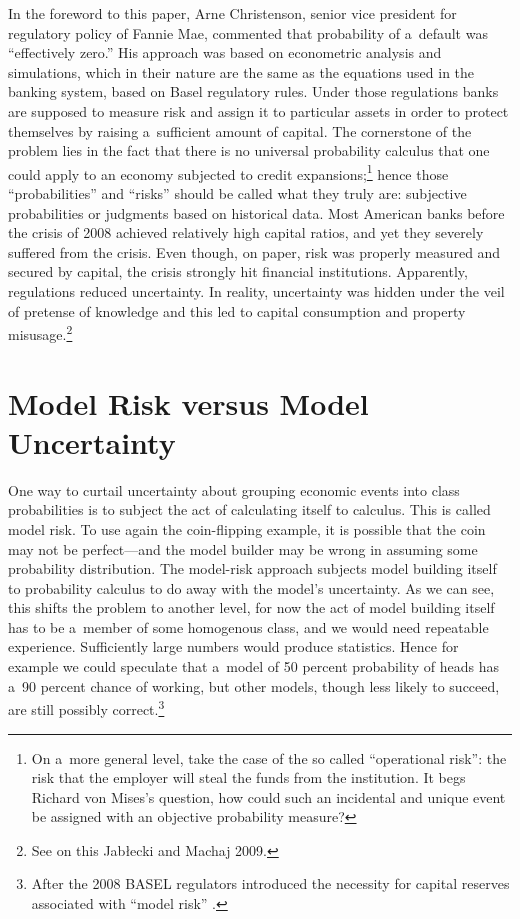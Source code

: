 In the foreword to this paper, Arne Christenson, senior vice president for regulatory policy of Fannie Mae, commented that probability of a~default was ``effectively zero.'' His approach was based on econometric analysis and simulations, which in their nature are the same as the equations used in the banking system, based on Basel regulatory rules. Under those regulations banks are supposed to measure risk and assign it to particular assets in order to protect themselves by raising a~sufficient amount of capital. The cornerstone of the problem lies in the fact that there is no universal probability calculus that one could apply to an economy subjected to credit expansions;\footnote{On a~more general level, take the case of the so called ``operational risk'': the risk that the employer will steal the funds from the institution. It begs Richard von Mises's question, how could such an incidental and unique event be assigned with an objective probability measure?} hence those ``probabilities'' and ``risks'' should be called what they truly are: subjective probabilities or judgments based on historical data. Most American banks before the crisis of 2008 achieved relatively high capital ratios, and yet they severely suffered from the crisis. Even though, on paper, risk was properly measured and secured by capital, the crisis strongly hit financial institutions. Apparently, regulations reduced uncertainty. In reality, uncertainty was hidden under the veil of pretense of knowledge and this led to capital consumption and property misusage.\footnote{See on this Jabłecki and Machaj 2009.}



\section{Model Risk versus Model Uncertainty}

One way to curtail uncertainty about grouping economic events into class probabilities is to subject the act of calculating itself to calculus. This is called model risk. To use again the coin-flipping example, it is possible that the coin may not be perfect---and the model builder may be wrong in assuming some probability distribution. The model-risk approach subjects model building itself to probability calculus to do away with the model's uncertainty. As we can see, this shifts the problem to another level, for now the act of model building itself has to be a~member of some homogenous class, and we would need repeatable experience. Sufficiently large numbers would produce statistics. Hence for example we could speculate that a~model of 50 percent probability of heads has a~90 percent chance of working, but other models, though less likely to succeed, are still possibly correct.\footnote{After the 2008 BASEL regulators introduced the necessity for capital reserves associated with ``model risk'' 
\parencite[][p.1295]{alexander_quantile_2012}.%
}



